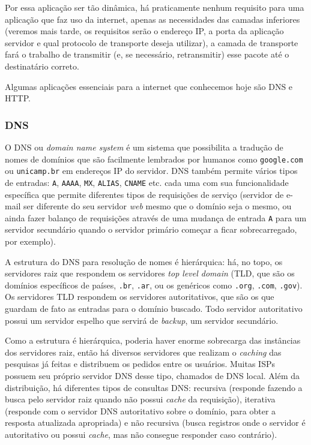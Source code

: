 \documentclass[brazilian,a4paper,twocolumn]{article}
\begin{document}
Por essa aplicação ser tão dinâmica, há praticamente nenhum requisito para uma aplicação que faz uso da internet, apenas as necessidades das camadas inferiores (veremos mais tarde, os requisitos serão o endereço IP, a porta da aplicação servidor e qual protocolo de transporte deseja utilizar), a camada de transporte fará o trabalho de transmitir (e, se necessário, retransmitir) esse pacote até o destinatário correto.

Algumas aplicações essenciais para a internet que conhecemos hoje são DNS e HTTP.

\subsubsection{DNS}

O DNS ou \textit{domain name system} é um sistema que possibilita a tradução de nomes de domínios que são facilmente lembrados por humanos como \texttt{google.com} ou \texttt{unicamp.br} em endereços IP do servidor. DNS também permite vários tipos de entradas: \texttt{A}, \texttt{AAAA}, \texttt{MX}, \texttt{ALIAS}, \texttt{CNAME} etc. cada uma com sua funcionalidade específica que permite diferentes tipos de requisições de serviço (servidor de e-mail ser diferente do seu servidor \textit{web} mesmo que o domínio seja o mesmo, ou ainda fazer balanço de requisições através de uma mudança de entrada \texttt{A} para um servidor secundário quando o servidor primário começar a ficar sobrecarregado, por exemplo).

A estrutura do DNS para resolução de nomes é hierárquica: há, no topo, os servidores raiz que respondem os servidores \textit{top level domain} (TLD, que são os domínios específicos de países, \texttt{.br}, \texttt{.ar}, ou os genéricos como \texttt{.org}, \texttt{.com}, \texttt{.gov}). Os servidores TLD respondem os servidores autoritativos, que são os que guardam de fato as entradas para o domínio buscado. Todo servidor autoritativo possui um servidor espelho que servirá de \textit{backup}, um servidor secundário.

Como a estrutura é hierárquica, poderia haver enorme sobrecarga das instâncias dos servidores raiz, então há diversos servidores que realizam o \textit{caching} das pesquisas já feitas e distribuem os pedidos entre os usuários. Muitas ISPs possuem seu próprio servidor DNS desse tipo, chamados de DNS local. Além da distribuição, há diferentes tipos de consultas DNS: recursiva (responde fazendo a busca pelo servidor raiz quando não possui \textit{cache} da requisição), iterativa (responde com o servidor DNS autoritativo sobre o domínio, para obter a resposta atualizada apropriada) e não recursiva (busca registros onde o servidor é autoritativo ou possui \textit{cache}, mas não consegue responder caso contrário).
\end{document}
